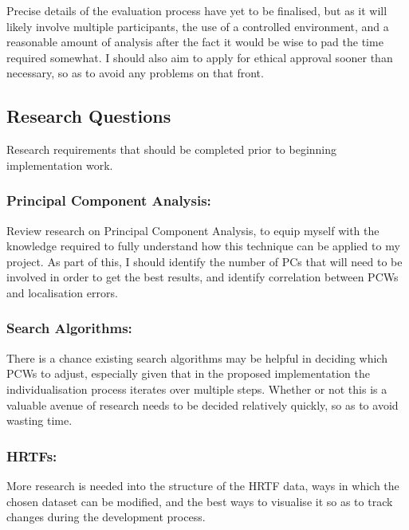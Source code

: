 \documentclass[10pt, oneside, a4paper, draft]{scrartcl}
\begin{document}
Precise details of the evaluation process have yet to be finalised, but as it will likely involve multiple participants, the use of a controlled environment, and a reasonable amount of analysis after the fact it would be wise to pad the time required somewhat. I should also aim to apply for ethical approval sooner than necessary, so as to avoid any problems on that front. 

\subsection*{Research Questions} %

Research requirements that should be completed prior to beginning implementation work. 

\subsubsection*{Principal Component Analysis:}

Review research on Principal Component Analysis, to equip myself with the knowledge required to fully understand how this technique can be applied to my project. As part of this, I should identify the number of PCs that will need to be involved in order to get the best results, and identify correlation between PCWs and localisation errors. 

\subsubsection*{Search Algorithms:} 

There is a chance existing search algorithms may be helpful in deciding which PCWs to adjust, especially given that in the proposed implementation the individualisation process iterates over multiple steps. Whether or not this is a valuable avenue of research needs to be decided relatively quickly, so as to avoid wasting time. 

\subsubsection*{HRTFs:}

More research is needed into the structure of the HRTF data, ways in which the chosen dataset can be modified, and the best ways to visualise it so as to track changes during the development process.

\section*{} 


\end{document}
